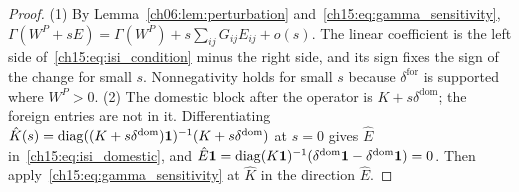 \documentclass[../structural_economics_book.tex]{subfiles}
\begin{document}
\begin{proof}
(1) By Lemma~\ref{ch06:lem:perturbation} and~\eqref{ch15:eq:gamma_sensitivity}, $\Gamma(W^P + sE) = \Gamma(W^P) + s\sum_{ij}G_{ij}E_{ij} + o(s)$. The linear coefficient is the left side of~\eqref{ch15:eq:isi_condition} minus the right side, and its sign fixes the sign of the change for small $s$. Nonnegativity holds for small $s$ because $\delta^{\text{for}}$ is supported where $W^P > 0$. (2) The domestic block after the operator is $K + s\delta^{\text{dom}}$; the foreign entries are not in it. Differentiating $\hat K(s) = \operatorname{diag}((K + s\delta^{\text{dom}})\mathbf{1})^{-1}(K + s\delta^{\text{dom}})$ at $s = 0$ gives $\hat E$ in~\eqref{ch15:eq:isi_domestic}, and $\hat E\mathbf{1} = \operatorname{diag}(K\mathbf{1})^{-1}(\delta^{\text{dom}}\mathbf{1} - \delta^{\text{dom}}\mathbf{1}) = 0$. Then apply~\eqref{ch15:eq:gamma_sensitivity} at $\hat K$ in the direction $\hat E$.
\end{proof}
\end{document}

